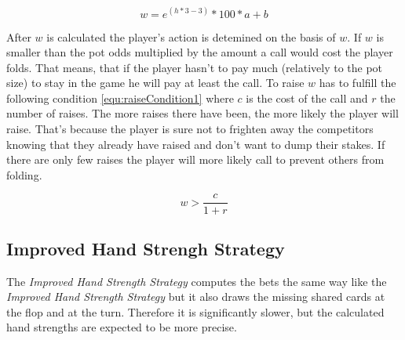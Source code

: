 \begin{equation}
	\label{equ:handStrength1}
	w = e^{(h * 3 - 3)} * 100 * a + b
\end{equation}

After $w$ is calculated the player's action is detemined on the basis of $w$. If $w$ is smaller than the pot odds multiplied by the amount a call would cost the player folds. That means, that if the player hasn't to pay much (relatively to the pot size) to stay in the game he will pay at least the call. To raise $w$ has to fulfill the following condition \ref{equ:raiseCondition1} where $c$ is the cost of the call and $r$ the number of raises. The more raises there have been, the more likely the player will raise. That's because the player is sure not to frighten away the competitors knowing that they already have raised and don't want to dump their stakes. If there are only few raises the player will more likely call to prevent others from folding.

\begin{equation}
	\label{equ:raiseCondition}
	w > \frac{c}{1 + r}
\end{equation}


\subsection{Improved Hand Strengh Strategy}
The \emph{Improved Hand Strength Strategy} computes the bets the same way like the \emph{Improved Hand Strength Strategy} but it also draws the missing shared cards at the flop and at the turn. Therefore it is significantly slower, but the calculated hand strengths are expected to be more precise.

